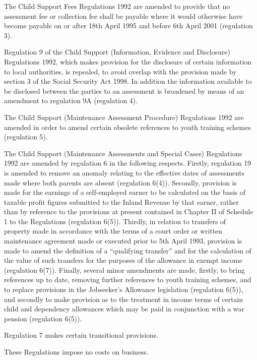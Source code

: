 \documentclass[12pt,a4paper]{article}
\begin{document}
  The Child Support Fees Regulations 1992 are amended to provide that no assessment fee or collection fee shall be payable where it would otherwise have become payable on or after 18th April 1995 and before 6th April 2001 (regulation 3).

  Regulation 9 of the Child Support (Information, Evidence and Disclosure) Regulations 1992, which makes provision for the disclosure of certain information to local authorities, is repealed, to avoid overlap with the provision made by section 3 of the Social Security Act 1998. In addition the information available to be disclosed between the parties to an assessment is broadened by means of an amendment to regulation 9A (regulation 4).

  The Child Support (Maintenance Assessment Procedure) Regulations 1992 are amended in order to amend certain obsolete references to youth training schemes (regulation 5).

  The Child Support (Maintenance Assessments and Special Cases) Regulations 1992 are amended by regulation 6 in the following respects. Firstly, regulation 19 is amended to remove an anomaly relating to the effective dates of assessments made where both parents are absent (regulation 6(4)). Secondly, provision is made for the earnings of a self-employed earner to be calculated on the basis of taxable profit figures submitted to the Inland Revenue by that earner, rather than by reference to the provisions at present contained in Chapter II of Schedule 1 to the Regulations (regulation 6(5)). Thirdly, in relation to transfers of property made in accordance with the terms of a court order or written maintenance agreement made or executed prior to 5th April 1993, provision is made to amend the definition of a “qualifying transfer” and for the calculation of the value of such transfers for the purposes of the allowance in exempt income (regulation 6(7)). Finally, several minor amendments are made, firstly, to bring references up to date, removing further references to youth training schemes, and to replace provisions in the Jobseeker’s Allowance legislation (regulation 6(5)), and secondly to make provision as to the treatment in income terms of certain child and dependency allowances which may be paid in conjunction with a war pension (regulation 6(5)).

  Regulation 7 makes certain transitional provisions.

  These Regulations impose no costs on business.
\end{document}
